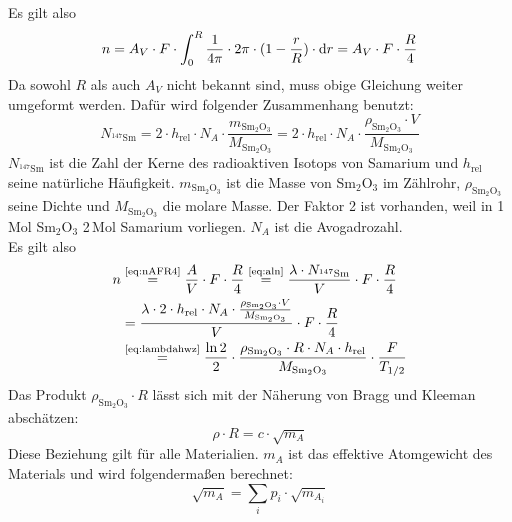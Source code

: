 Es gilt also
\begin{equation}
\label{eq:nAFR4}
  n=A_V \cdot F \cdot \int_{0}^{R}{\frac{1}{4\pi}\cdot 2\pi \cdot (1-\frac{r}{R}) \cdot \mathrm{d} r}=
  A_V \cdot F \cdot \frac{R}{4}
\end{equation}
Da sowohl $R$ als auch $A_V$ nicht bekannt sind, muss obige Gleichung weiter umgeformt werden.
Dafür wird folgender Zusammenhang benutzt:
\begin{equation}
  N_{{}^{147}\text{Sm}}=
  2 \cdot h_{\text{rel}} \cdot N_A \cdot \frac{m_{\text{Sm}_2\text{O}_3}}{M_{\text{Sm}_2\text{O}_3}}=
  2 \cdot h_{\text{rel}} \cdot N_A \cdot \frac{\rho_{\text{Sm}_2\text{O}_3} \cdot V}{M_{\text{Sm}_2\text{O}_3}}
\end{equation}
$  N_{{}^{147}\text{Sm}}$ ist die Zahl der Kerne des radioaktiven Isotops von Samarium und
$h_{\text{rel}}$ seine natürliche Häufigkeit. $m_{\text{Sm}_2\text{O}_3}$ ist die Masse von Sm$_2$O$_3$ im Zählrohr,
$\rho_{\text{Sm}_2\text{O}_3}$ seine Dichte und $M_{\text{Sm}_2\text{O}_3}$ die molare Masse.
Der Faktor 2 ist vorhanden, weil in 1\,Mol Sm$_2$O$_3$ 2\,Mol Samarium vorliegen.
$N_A$ ist die Avogadrozahl.\\
Es gilt also
\begin{equation}
\label{eq:samarium:halflife}
\begin{split}
  n & \refeq{eq:nAFR4}
  \frac{A}{V} \cdot F \cdot \frac{R}{4} \refeq{eq:aln} \frac{\lambda \cdot N_{{}^{147}\text{Sm}}}{V} \cdot F \cdot \frac{R}{4} \\
  &= \frac{\lambda \cdot 2 \cdot h_{\text{rel}} \cdot N_A \cdot
  \frac{\rho_{\text{Sm}_2\text{O}_3} \cdot V}{M_{\text{Sm}_2\text{O}_3}}}{V} \cdot F \cdot \frac{R}{4} \\
  & \refeq{eq:lambdahwz} \frac{\ln 2}{2} \cdot \frac{\rho_{\text{Sm}_2\text{O}_3} \cdot R \cdot N_A \cdot h_{\text{rel}}}{M_{\text{Sm}_2\text{O}_3}} 
  \cdot \frac{F}{T_{1/2}}
  \end{split}
\end{equation}
Das Produkt $\rho_{\text{Sm}_2\text{O}_3} \cdot R$ lässt sich mit der Näherung von Bragg und Kleeman abschätzen:
\begin{equation}
  \rho \cdot R = c \cdot \sqrt{m_A}
\end{equation}
Diese Beziehung gilt für alle Materialien. $m_A$ ist das effektive Atomgewicht des Materials
und wird folgendermaßen berechnet:
\begin{equation}
  \sqrt{m_A} = \sum_{i}p_i \cdot \sqrt{m_{A_i}}
\end{equation}
